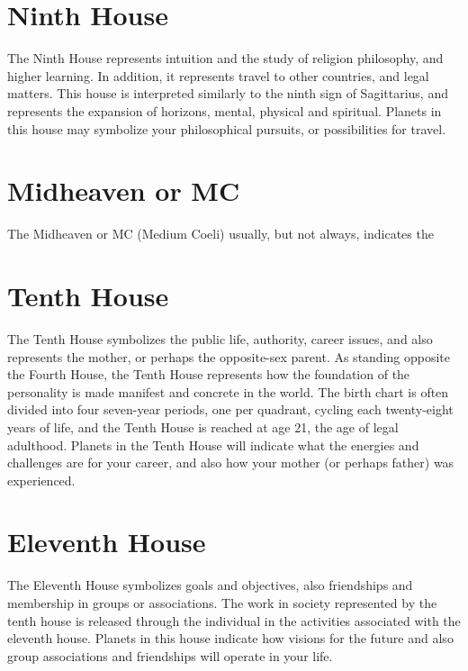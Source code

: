 \documentclass[12pt,twoside,openright]{memoir}
\begin{document}
\section {Ninth House}
The Ninth House represents intuition and the study of religion philosophy, and higher learning. In addition, it represents travel to other countries, and legal matters. This house is interpreted similarly to the ninth sign of Sagittarius, and represents the expansion of horizons, mental, physical and spiritual. Planets in this house may symbolize your philosophical pursuits, or possibilities for travel.

\section {Midheaven or MC}
The Midheaven or MC (Medium Coeli) usually, but not always, indicates the %

\section {Tenth House}
The Tenth House symbolizes the public life, authority, career issues, and also represents the mother, or perhaps the opposite-sex parent. As standing opposite the Fourth House, the Tenth House represents how the foundation of the personality is made manifest and concrete in the world. The birth chart is often divided into four seven-year periods, one per quadrant, cycling each twenty-eight years of life, and the Tenth House is reached at age 21, the age of legal adulthood. Planets in the Tenth House will indicate what the energies and challenges are for your career, and also how your mother (or perhaps father) was experienced.

\section {Eleventh House}
The Eleventh House symbolizes goals and objectives, also friendships and membership in groups or associations. The work in society represented by the tenth house is released through the individual in the activities associated with the eleventh house. Planets in this house indicate how visions for the future and also group associations and friendships will operate in your life.
\end{document}
